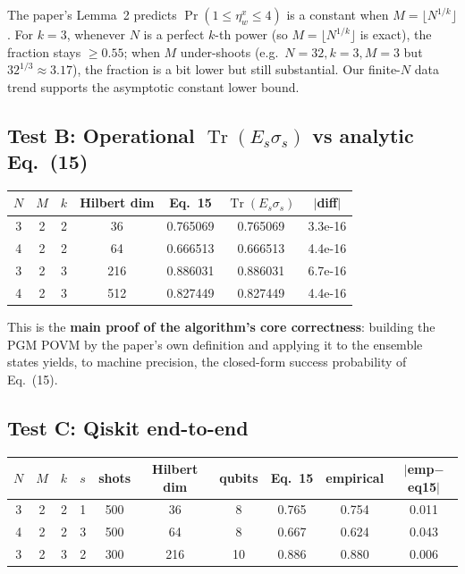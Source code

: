 \documentclass[11pt]{article}
\begin{document}
The paper's Lemma~2 predicts $\Pr(1\le\eta_w^x\le 4)$ is a constant when
$M=\lfloor N^{1/k}\rfloor$. For $k=3$, whenever $N$ is a
perfect $k$-th power (so $M=\lfloor N^{1/k}\rfloor$ is exact), the fraction
stays $\ge 0.55$; when $M$ under-shoots (e.g.\ $N=32,k=3,M=3$ but
$32^{1/3}\approx 3.17$), the fraction is a bit lower but still substantial.
Our finite-$N$ data trend supports the asymptotic constant lower bound.

\subsection{Test B: Operational $\operatorname{Tr}(E_s\sigma_s)$ vs analytic Eq.~(15)}
\begin{center}
\small
\begin{tabular}{ccccccc}\toprule
$N$ & $M$ & $k$ & Hilbert dim & Eq.~15 & $\operatorname{Tr}(E_s\sigma_s)$ & $|$diff$|$ \\ \midrule
3 & 2 & 2 & 36  & 0.765069 & 0.765069 & 3.3e-16 \\
4 & 2 & 2 & 64  & 0.666513 & 0.666513 & 4.4e-16 \\
3 & 2 & 3 & 216 & 0.886031 & 0.886031 & 6.7e-16 \\
4 & 2 & 3 & 512 & 0.827449 & 0.827449 & 4.4e-16 \\
\bottomrule
\end{tabular}
\end{center}

This is the \textbf{main proof of the algorithm's core correctness}:
building the PGM POVM by the paper's own definition and applying it to
the ensemble states yields, to machine precision, the closed-form
success probability of Eq.~(15).

\subsection{Test C: Qiskit end-to-end}
\begin{center}
\small
\begin{tabular}{cccccccccc}\toprule
$N$ & $M$ & $k$ & $s$ & shots & Hilbert dim & qubits & Eq.~15 & empirical & $|$emp$-$eq15$|$ \\ \midrule
3 & 2 & 2 & 1 & 500 & 36  & 8  & 0.765 & 0.754 & 0.011 \\
4 & 2 & 2 & 3 & 500 & 64  & 8  & 0.667 & 0.624 & 0.043 \\
3 & 2 & 3 & 2 & 300 & 216 & 10 & 0.886 & 0.880 & 0.006 \\
\bottomrule
\end{tabular}
\end{center}
\end{document}
